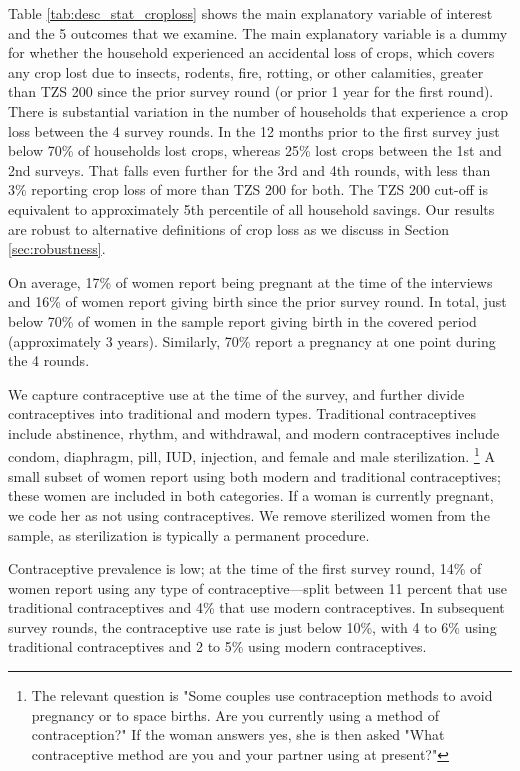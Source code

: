 \documentclass[letterpaper,12pt]{article}
\begin{document}
Table \ref{tab:desc_stat_croploss} shows the main explanatory variable of interest 
and the 5 outcomes that we examine.
The main explanatory variable is a dummy for whether the household experienced 
an accidental loss of crops, which covers any crop lost due to insects, 
rodents, fire, rotting, or other calamities, greater than TZS 200 since the 
prior survey round (or prior 1 year for the first round).
There is substantial variation in the number of households that experience a 
crop loss between the 4 survey rounds.
In the 12 months prior to the first survey just below 70\% of households 
lost crops, whereas 25\% lost crops between the 1st and 2nd surveys.
That falls even further for the 3rd and 4th rounds, with less than 3\% 
reporting crop loss of more than TZS 200 for both.
The TZS 200 cut-off is equivalent to approximately 5th 
percentile of all household savings.
Our results are robust to alternative definitions of crop loss as we
discuss in Section \ref{sec:robustness}.


On average, 17\% of women report being pregnant at the time of the interviews 
and 16\% of women report giving birth since the prior survey round.
In total, just below 70\% of women in the sample report giving birth in
the covered period (approximately 3 years).
Similarly, 70\% report a pregnancy at one point during the 4 rounds.


We capture contraceptive use at the time of the survey, and further divide
contraceptives into traditional and modern types. 
Traditional contraceptives include abstinence, rhythm, and withdrawal, 
and modern contraceptives include condom, diaphragm, pill, IUD, injection,
and female and male sterilization.%
\footnote{
The relevant question is "Some couples use contraception methods to avoid
pregnancy or to space births. Are you currently using a method of contraception?"
If the woman answers yes, she is then asked "What contraceptive method are you
and your partner using at present?"
}
A small subset of women report using both modern and traditional contraceptives;
these women are included in both categories.
If a woman is currently pregnant, we code her as not using contraceptives.
We remove sterilized women from the sample, as sterilization is typically a 
permanent procedure.

Contraceptive prevalence is low; at the time of the first survey round, 14\% 
of women report using any type of contraceptive---split between 11 percent that use 
traditional contraceptives and 4\% that use modern contraceptives.
In subsequent survey rounds, the contraceptive use rate is just below 10\%, 
with 4 to 6\% using traditional contraceptives and 2 to 5\% 
using modern contraceptives.
\end{document}
